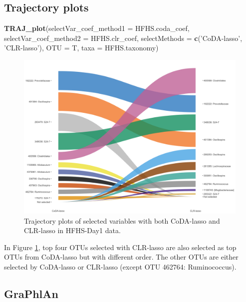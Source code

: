 \documentclass[openany]{book}
\newenvironment{Shaded}{\begin{snugshade}}{\end{snugshade}}
\newcommand{\KeywordTok}[1]{\textcolor[rgb]{0.13,0.29,0.53}{\textbf{#1}}}
\newcommand{\DataTypeTok}[1]{\textcolor[rgb]{0.13,0.29,0.53}{#1}}
\newcommand{\StringTok}[1]{\textcolor[rgb]{0.31,0.60,0.02}{#1}}
\newcommand{\NormalTok}[1]{#1}
\begin{document}
\subsection{Trajectory plots}\label{trajectory-plots-1}

\begin{Shaded}
\begin{Highlighting}[]
\KeywordTok{TRAJ_plot}\NormalTok{(}\DataTypeTok{selectVar_coef_method1 =}\NormalTok{ HFHS.coda_coef, }\DataTypeTok{selectVar_coef_method2 =}\NormalTok{ HFHS.clr_coef, }
          \DataTypeTok{selectMethods =} \KeywordTok{c}\NormalTok{(}\StringTok{'CoDA-lasso'}\NormalTok{, }\StringTok{'CLR-lasso'}\NormalTok{), }\DataTypeTok{OTU =}\NormalTok{ T, }\DataTypeTok{taxa =}\NormalTok{ HFHS.taxonomy)}
\end{Highlighting}
\end{Shaded}

\begin{figure}

{\centering \includegraphics[width=1\linewidth]{./Generated_plots/trajHFHS-1} 

}

\caption{Trajectory plots of selected variables with both CoDA-lasso and CLR-lasso in HFHS-Day1 data.}\label{fig:trajHFHS}
\end{figure}

In Figure \ref{fig:trajHFHS}, top four OTUs selected with CLR-lasso are
also selected as top OTUs from CoDA-lasso but with different order. The
other OTUs are either selected by CoDA-lasso or CLR-lasso (except OTU
462764: Ruminococcus).

\subsection{GraPhlAn}\label{graphlan}
\end{document}
